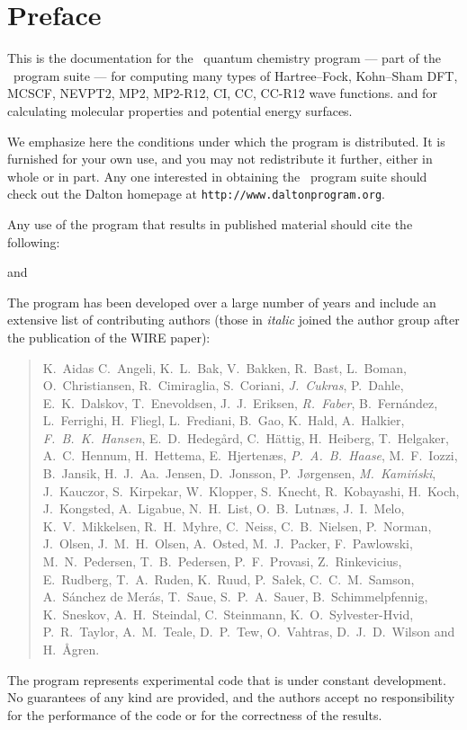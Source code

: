 \tableofcontents

\chapter*{Preface}

This is the documentation for the \dalton\ quantum chemistry program
--- part of the \latestrelease\ program suite ---
for computing many types of Hartree--Fock, Kohn--Sham DFT, 
MCSCF, NEVPT2, MP2, MP2-R12, CI, CC, CC-R12 wave functions.
and for calculating molecular properties and potential energy surfaces.

          We emphasize here the conditions under which the
program is distributed.  It is furnished for your own use,
and you may not redistribute it further, either in whole or in
part.  Any one interested in obtaining the \latestrelease\ program suite
should check out the Dalton homepage at \verb|http://www.daltonprogram.org|.

Any use of the program that results in published
material should cite the following:
\begin{quote}
\end{quote}
and
\begin{quote}
\end{quote}

The program has been developed over a large number of years and
include an extensive list of contributing authors
(those in {\em italic} joined the author group after the publication of the WIRE paper):

\begin{quote}\raggedright
K.~Aidas
C.~Angeli,
K.~L.~Bak,
V.~Bakken,
R.~Bast,
L.~Boman,
O.~Christiansen,
R.~Cimiraglia,
S.~Coriani,
{\em J.~Cukras},
P.~Dahle,
E.~K.~Dalskov,
T.~Enevoldsen,
J.~J.~Eriksen,
{\em R.~Faber},
B.~Fern\'{a}ndez,
L.~Ferrighi,
H.~Fliegl,
L.~Frediani,
B.~Gao,
K.~Hald,
A.~Halkier,
{\em F.~B.~K.~Hansen},
E.~D.~Hedeg\aa{}rd,
C.~H{\"a}ttig,
H.~Heiberg,
T.~Helgaker,
A.~C.~Hennum,
H.~Hettema,
E.~Hjerten\ae{}s,
{\em P.~A.~B.~Haase},
M.~F.~Iozzi,
B.~Jansik,
H.~J.~Aa.~Jensen,
D.~Jonsson,
P.~J{\o}rgensen,
{\em M.~Kami{\'n}ski},
J.~Kauczor,
S.~Kirpekar,
W.~Klopper,
S.~Knecht,
R.~Kobayashi,
H.~Koch,
J.~Kongsted,
A.~Ligabue,
N.~H.~List,
O.~B.~Lutn\ae{}s,
J.~I.~Melo,
K.~V.~Mikkelsen,
R.~H.~Myhre,
C.~Neiss,
C.~B.~Nielsen,
P.~Norman,
J.~Olsen,
J.~M.~H.~Olsen,
A.~Osted,
M.~J.~Packer,
F.~Pawlowski,
M.~N.~Pedersen,
T.~B.~Pedersen,
P.~F.~Provasi,
Z.~Rinkevicius,
E.~Rudberg,
T.~A.~Ruden,
K.~Ruud,
P.~Sa\l{}ek,
C.~C.~M.~Samson,
A.~S\'{a}nchez de Mer\'{a}s,
T.~Saue,
S.~P.~A.~Sauer,
B.~Schimmelpfennig,
K.~Sneskov,
A.~H.~Steindal,
C.~Steinmann,
K.~O.~Sylvester-Hvid,
P.~R.~Taylor,
A.~M.~Teale,
D.~P.~Tew,
O.~Vahtras,
D.~J.~D.~Wilson
and H.~{\AA}gren.
\end{quote}

          The program represents experimental code that is
under constant development.  No guarantees of any kind are
provided, and the authors accept no responsibility for the
performance of the code or for the correctness of the results.
